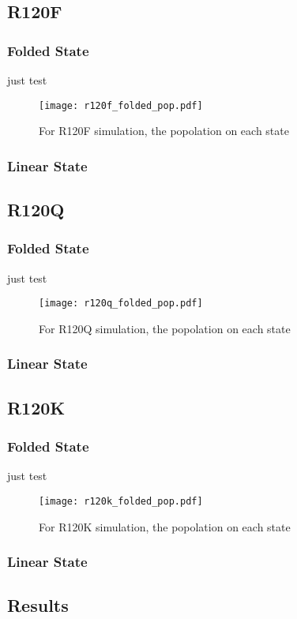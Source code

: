\documentclass{article}
\begin{document}
\subsection{R120F}
\subsubsection{Folded State}
just test
\begin{figure}[h]
    \texttt{[image: r120f\_folded\_pop.pdf]}
    \caption{For R120F simulation, the popolation on each state}
    \label{r120fpop}
\end{figure}
\subsubsection{Linear State}

\subsection{R120Q}
\subsubsection{Folded State}
just test
\begin{figure}[h]
    \texttt{[image: r120q\_folded\_pop.pdf]}
    \caption{For R120Q simulation, the popolation on each state}
    \label{r120qpop}
\end{figure}
\subsubsection{Linear State}

\subsection{R120K}
\subsubsection{Folded State}
just test
\begin{figure}[h]
    \texttt{[image: r120k\_folded\_pop.pdf]}
    \caption{For R120K simulation, the popolation on each state}
    \label{r120kpop}
\end{figure}
\subsubsection{Linear State}

\subsection{Results}
\end{document}
